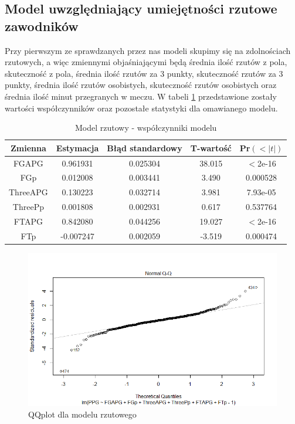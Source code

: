 \documentclass[11pt,a4paper]{article}
\begin{document}
\subsection{Model uwzględniający umiejętności rzutowe zawodników}
Przy pierwszym ze sprawdzanych przez nas modeli skupimy się na zdolnościach rzutowych, a więc zmiennymi objaśniającymi będą średnia ilość rzutów z pola, skuteczność z pola, średnia ilość rzutów za 3 punkty, skuteczność rzutów za 3 punkty, średnia ilość rzutów osobistych, skuteczność rzutów osobistych oraz średnia ilość minut przegranych w meczu. W tabeli \ref{offense} przedstawione zostały wartości współczynników oraz pozostałe statystyki dla omawianego modelu. 
\begin{table}[H]
	\begin{tabular}{| c | c | c | c | c |}
		\hline
		Zmienna & Estymacja & Błąd standardowy & T-wartość & Pr$(<|t|)$\\ \hline
		FGAPG & 0.961931 & 0.025304 & 38.015 & $<$2e-16\\ \hline
		FGp & 0.012008 & 0.003441 & 3.490 & 0.000528\\ \hline
		ThreeAPG & 0.130223 & 0.032714 & 3.981 & 7.93e-05\\ \hline 
		ThreePp & 0.001808 & 0.002931 & 0.617 & 0.537764\\ \hline
		FTAPG & 0.842080 & 0.044256 & 19.027 & $<$2e-16\\ \hline
		FTp  & -0.007247 & 0.002059 & -3.519 & 0.000474\\ \hline
	\end{tabular}
	\caption{Model rzutowy - współczynniki modelu}
	\label{offense}
\end{table}
\begin{figure}[t]
\includegraphics[width=\textwidth]{offense_2}
\caption{QQplot dla modelu rzutowego}
\label{qqplot_offense}
\centering
\end{figure}
\end{document}
